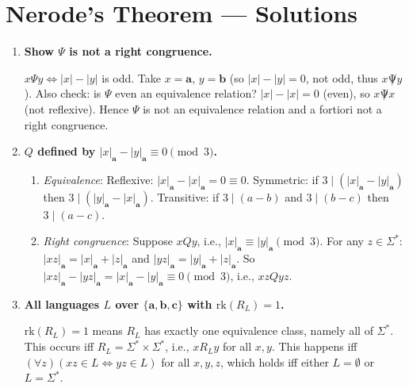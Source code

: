 \chapter{Nerode's Theorem --- Solutions}

\begin{enumerate}[{2.}1.]

\item \textbf{Show $\Psi$ is not a right congruence.}

$x \Psi y \Leftrightarrow |x|-|y|$ is odd. Take $x=\mathbf{a}$, $y=\mathbf{b}$ (so $|x|-|y|=0$, not odd, thus $x\not \Psi y$). Also check: is $\Psi$ even an equivalence relation? $|x|-|x|=0$ (even), so $x\not \Psi x$ (not reflexive). Hence $\Psi$ is not an equivalence relation and a fortiori not a right congruence.

\item \textbf{$Q$ defined by $|x|_\mathbf{a}-|y|_\mathbf{a}\equiv 0\pmod{3}$.}

\begin{enumerate}
\item \textit{Equivalence}: Reflexive: $|x|_\mathbf{a}-|x|_\mathbf{a}=0\equiv 0$. Symmetric: if $3\mid(|x|_\mathbf{a}-|y|_\mathbf{a})$ then $3\mid(|y|_\mathbf{a}-|x|_\mathbf{a})$. Transitive: if $3\mid(a-b)$ and $3\mid(b-c)$ then $3\mid(a-c)$.

\item \textit{Right congruence}: Suppose $x Q y$, i.e., $|x|_\mathbf{a}\equiv|y|_\mathbf{a}\pmod{3}$. For any $z\in\Sigma^*$:
$|xz|_\mathbf{a}=|x|_\mathbf{a}+|z|_\mathbf{a}$ and $|yz|_\mathbf{a}=|y|_\mathbf{a}+|z|_\mathbf{a}$. So $|xz|_\mathbf{a}-|yz|_\mathbf{a}=|x|_\mathbf{a}-|y|_\mathbf{a}\equiv 0\pmod{3}$, i.e., $xz Q yz$.
\end{enumerate}

\item \textbf{All languages $L$ over $\{\mathbf{a},\mathbf{b},\mathbf{c}\}$ with $\mathrm{rk}(R_L)=1$.}

$\mathrm{rk}(R_L)=1$ means $R_L$ has exactly one equivalence class, namely all of $\Sigma^*$. This occurs iff $R_L = \Sigma^*\times\Sigma^*$, i.e., $x R_L y$ for all $x,y$. This happens iff $(\forall z)(xz\in L\Leftrightarrow yz\in L)$ for all $x,y,z$, which holds iff either $L=\emptyset$ or $L=\Sigma^*$.


\end{enumerate}
